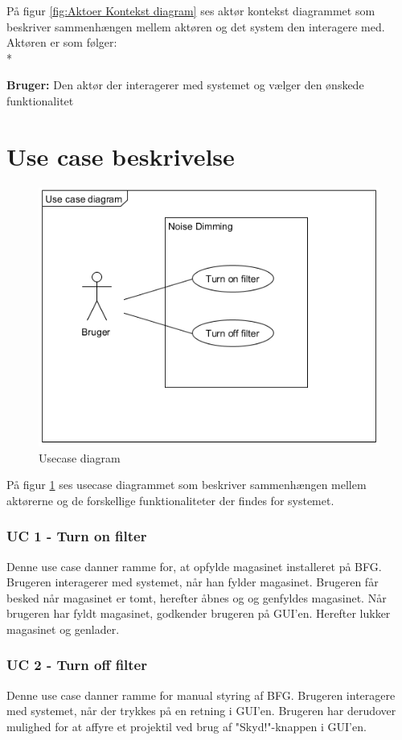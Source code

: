 På figur \ref{fig:Aktoer Kontekst diagram} ses aktør kontekst diagrammet som beskriver sammenhængen mellem aktøren og det system den interagere med. Aktøren er som følger: \\*

\textbf{Bruger:} Den aktør der interagerer med systemet og vælger den ønskede funktionalitet \\


\section{Use case beskrivelse}

\begin{figure}[H]
	\centering
	\includegraphics[width = 300 pt]{Img/Usecase_Diagram.png}
	\caption{Usecase diagram}
	\label{fig:Usecase diagram}
\end{figure}

På figur \ref{fig:Usecase diagram} ses usecase diagrammet som beskriver sammenhængen mellem aktørerne og de forskellige funktionaliteter der findes for systemet.

\subsubsection{UC 1 - Turn on filter}
Denne use case danner ramme for, at opfylde magasinet installeret på BFG. Brugeren interagerer med systemet, når han fylder magasinet. Brugeren får besked når magasinet er tomt, herefter åbnes og og genfyldes magasinet. Når brugeren har fyldt magasinet, godkender brugeren på GUI'en. Herefter lukker magasinet og genlader. 

\subsubsection{UC 2 - Turn off filter}
Denne use case danner ramme for manual styring af BFG. Brugeren interagere med systemet, når der trykkes på en retning i GUI'en. Brugeren har derudover mulighed for at affyre et projektil ved brug af "Skyd!"-knappen i GUI'en.  



